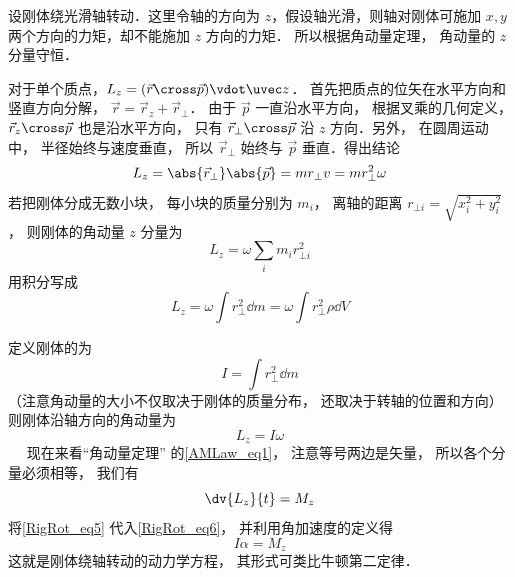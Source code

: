 

设刚体绕光滑轴转动．这里令轴的方向为 $z$，假设轴光滑，则轴对刚体可施加 $x, y$ 两个方向的力矩，却不能施加 $z$ 方向的力矩． 所以根据角动量定理， 角动量的 $z$ 分量守恒．

对于单个质点，$L_z = ( \vec r \cross \vec p ) \vdot \uvec z$． 首先把质点的位矢在水平方向和竖直方向分解， $\vec r = \vec r_z + \vec r_ \bot$． 由于 $\vec p$ 一直沿水平方向， 根据叉乘的几何定义， $\vec r_z \cross \vec p$ 也是沿水平方向， 只有 $\vec r_ \bot \cross \vec p$ 沿 $z$ 方向．另外， 在圆周运动中， 半径始终与速度垂直， 所以 $\vec r_ \bot$ 始终与 $\vec p$ 垂直．得出结论
\begin{equation}
L_z = \abs{\vec r_\bot} \abs{\vec p} = m r_ \bot v = mr_ \bot ^2\omega 
\end{equation}
若把刚体分成无数小块， 每小块的质量分别为 $m_i$， 离轴的距离 $r_{\bot i} = \sqrt{x_i^2 + y_i^2} $， 则刚体的角动量 $z$ 分量为
\begin{equation}
L_z = \omega \sum_i m_i r_{ \bot i}^2
\end{equation}
用积分写成
\begin{equation}
L_z = \omega \int r_ \bot ^2 \dd{m} = \omega \int r_ \bot ^2\rho  \dd{V} 
\end{equation}

定义刚体的为
\begin{equation}
I = \int r_ \bot ^2 \dd{m} 
\end{equation}
（注意角动量的大小不仅取决于刚体的质量分布， 还取决于转轴的位置和方向）则刚体沿轴方向的角动量为
\begin{equation}\label{RigRot_eq5}
L_z = I\omega 
\end{equation}
 
现在来看“角动量定理” 的\autoref{AMLaw_eq1}， 注意等号两边是矢量， 所以各个分量必须相等， 我们有
\begin{equation}\label{RigRot_eq6}
\dv{L_z}{t} = M_z
\end{equation}
将\autoref{RigRot_eq5} 代入\autoref{RigRot_eq6}， 并利用角加速度的定义得
\begin{equation}\label{RigRot_eq7}
I\alpha = M_z
\end{equation}
这就是刚体绕轴转动的动力学方程， 其形式可类比牛顿第二定律．

